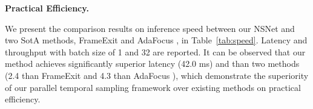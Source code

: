 \documentclass[runningheads]{llncs}
\newcommand{\tabref}[1]{Table~\ref{#1}}
\begin{document}
\noindent\textbf{Practical Efficiency.}
\begin{table}[t]
\setlength{\tabcolsep}{4pt}
\renewcommand{\arraystretch}{0.9}
\caption{Comparison of practical efficiency between SotA methods. }\label{tab:speed}
\end{table} We present the comparison results on inference speed between our NSNet and two SotA methods, FrameExit \cite{frameexit} and AdaFocus \cite{adafocus}, in \tabref{tab:speed}.  Latency and throughput with batch size of 1 and 32 are reported\footnotemark[1]. 
It can be observed that our method achieves significantly superior latency (42.0 ms) and than two methods (2.4 than FrameExit \cite{frameexit} and 4.3 than AdaFocus \cite{adafocus}), which demonstrate the superiority of our parallel temporal sampling framework over existing methods on practical efficiency.
\end{document}
